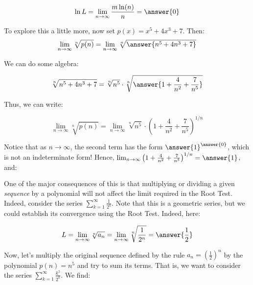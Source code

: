 \documentclass{ximera}
\begin{document}
\begin{exercise}
\begin{exercise}
\[
\ln L  = \lim_{n \to \infty} \frac{m\ln(n)}{n} = \answer{0}
\] 


\begin{exercise}
To explore this a little more, now set $p(x) = x^5+4x^3+7$.  Then:
\[
\lim_{n \to \infty}\sqrt[n]{p(n)} = \lim_{n \to \infty} \sqrt[n]{\answer{n^5+4n^3+7}}
\]

We can do some algebra:

\[
\sqrt[n]{n^5+4n^3+7} = \sqrt[n]{n^5} \cdot \sqrt[n]{\answer{1+\frac{4}{n^2}+\frac{7}{n^5}}}
\]

\begin{exercise}
Thus, we can write:

\[
\lim_{n \to \infty}\sqrt[n]{p(n)} = \lim_{n \to \infty} \sqrt[n]{n^5} \cdot \left(1+\frac{4}{n^2}+\frac{7}{n^5}\right)^{1/n}
\]

Notice that as $n \to \infty$, the second term has the form $\answer{1}^{\answer{0}}$, which is not an indeterminate form!  Hence, $\lim_{n \to \infty}  \left(1+\frac{4}{n^2}+\frac{7}{n^5}\right)^{1/n} = \answer{1}$, and:

\begin{image}
  \end{image}


\end{exercise}

\end{exercise}


\begin{exercise}
One of the major consequences of this is that multiplying or dividing a given \emph{sequence} by a polynomial will not affect the limit required in the Root Test.  Indeed, consider the series $\sum_{k=1}^{\infty} \frac{1}{2^k}$.  Note that this is a geometric series, but we could establish its convergence using the Root Test.  Indeed, here:

\[
L = \lim_{n \to \infty} \sqrt[n]{a_n} = \lim_{n \to \infty}\sqrt[n]{\frac{1}{2^n}} = \answer{\frac{1}{2}}
\]

Now, let's multiply the original sequence defined by the rule $a_n = \left(\frac{1}{2}\right)^n$ by the polynomial $p(n) = n^5$ and try to sum its terms.  That is, we want to consider the series $\sum_{k=1}^{\infty} \frac{k^5}{2^k}$. We find:


\end{exercise}
\end{exercise}
\end{exercise}
\end{document}
